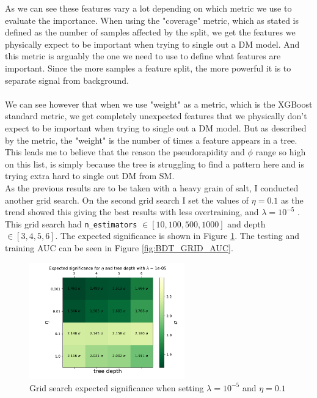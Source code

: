 \documentclass[14pt, a4paper]{book}
\begin{document}
\newpage\noindent As we can see these features vary a lot depending on which metric we use to evaluate the importance. 
When using the "coverage" metric, which as stated is defined as the number of samples affected by the split, we get the features we physically expect to be important when trying to single out a DM model.
And this metric is arguably the one we need to use to define what features are important. Since the more samples a feature split, the more powerful it is to separate signal from background.\\
\\We can see however that when we use "weight" as a metric, which is the XGBoost standard metric, we get completely unexpected features that we physically don't expect to be important when trying to single out a DM model.
But as described by the metric, the "weight" is the number of times a feature appears in a tree. This leads me to believe that the reason the pseudorapidity and $\phi$ range so high on this list, 
is simply because the tree is struggling to find a pattern here and is trying extra hard to single out DM from SM. \\
\newpage\noindent As the previous results are to be taken with a heavy grain of salt, I conducted another grid search. On the second grid search I set the values of $\eta=0.1$ as the trend showed this giving the best results with less overtraining, 
and $\lambda=10^{-5}$ . This grid search had \verb|n_estimators| $\in[10, 100, 500, 1000]$ and depth $\in[3,4,5,6]$. 
The expected significance is shown in Figure \ref{fig:BDT_sig}. The testing and training AUC can be seen in Figure \ref{fig:BDT_GRID_AUC}.
\graphicspath{{../../../Plots/XGBoost/FULL/GRIDSEARCH_n_est_10-1000}}
\begin{figure}[!ht]
   \centering
   \includegraphics[width=0.6\textwidth]{Expected_significance.pdf}  
   \caption{Grid search expected significance when setting $\lambda=10^{-5}$ and $\eta=0.1$}\label{fig:BDT_sig}
\end{figure}
\end{document}
